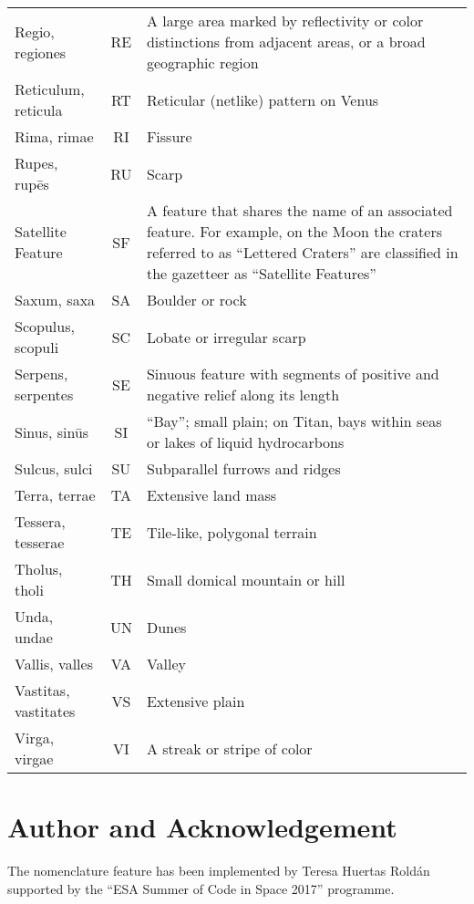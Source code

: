 \begin{longtable}{l|c|p{72mm}}
Regio, regiones       & RE & A large area marked by reflectivity or color distinctions from adjacent areas, 
                             or a broad geographic region\\%
Reticulum, reticula   & RT & Reticular (netlike) pattern on Venus\\%
Rima, rimae           & RI & Fissure\\%
Rupes, rupēs          & RU & Scarp\\\midrule
Satellite Feature     & SF & A feature that shares the name of an associated feature. 
                             For example, on the Moon the craters referred to as ``Lettered Craters'' 
							 are classified in the gazetteer as ``Satellite Features''\\%
Saxum, saxa           & SA & Boulder or rock\\%
Scopulus, scopuli     & SC & Lobate or irregular scarp\\%
Serpens, serpentes    & SE & Sinuous feature with segments of positive and negative relief along its length\\%
Sinus, sinūs          & SI & ``Bay''; small plain; on Titan, bays within seas or lakes of liquid hydrocarbons\\%
Sulcus, sulci         & SU & Subparallel furrows and ridges\\\midrule
Terra, terrae         & TA & Extensive land mass\\%
Tessera, tesserae     & TE & Tile-like, polygonal terrain\\%
Tholus, tholi         & TH & Small domical mountain or hill\\\midrule
Unda, undae           & UN & Dunes\\\midrule
Vallis, valles        & VA & Valley\\%
Vastitas, vastitates  & VS & Extensive plain\\%
Virga, virgae         & VI & A streak or stripe of color\\\bottomrule
\end{longtable}


\section*{Author and Acknowledgement}
\label{sec:Nomenclature:Acknowledgments}
The nomenclature feature has been implemented by Teresa Huertas Roldán supported by the ``ESA Summer of Code in Space 2017'' programme.


